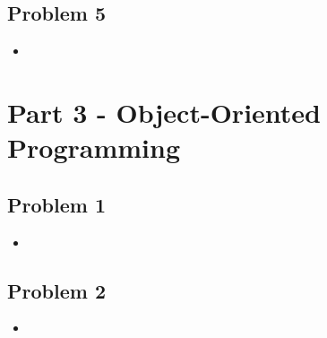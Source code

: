 \documentclass{article}
\newcommand{\insertcode}[2]{\begin{itemize}\item[]\end{itemize}} %
\begin{document}
\subsection*{Problem 5}
\insertcode{"p25.pl"}{} %

\vspace{5mm}

\section*{Part 3 - Object-Oriented Programming}

\subsection*{Problem 1}
\insertcode{"p31.pl"}{} %

\subsection*{Problem 2}
\insertcode{"p32.pl"}{} %

\end{document}
